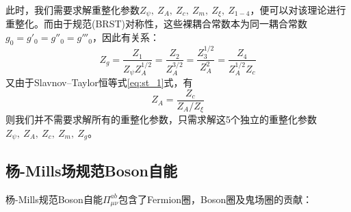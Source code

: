 此时，我们需要求解重整化参数$Z_\psi,~Z_A,~Z_c,~Z_m,~Z_\xi,~Z_{1-4}$，便可以对该理论进行重整化。而由于规范(BRST)对称性，这些裸耦合常数本为同一耦合常数$g_0=g'_0=g''_0=g'''_0$，因此有关系：
\begin{equation}
    Z_g= \frac{Z_1}{Z_\psi Z_A^{1/2}} = \frac{Z_2}{Z_A^{3/2}}=\frac{Z_3^{1/2}}{Z_A^{2}}=\frac{Z_4}{Z^{1/2}_AZ_c}
\end{equation}
又由于Slavnov–Taylor恒等式\eqref{eq:st_1}式，有
\begin{equation}
    Z_A = \frac{Z_c}{Z_A/Z_\xi}
\end{equation}
则我们并不需要求解所有的重整化参数，只需求解这5个独立的重整化参数$Z_\psi,~Z_A,~Z_c,~Z_m,~Z_{g}$。
\subsection{杨-Mills场规范Boson自能}
杨-Mills规范Boson自能$\Pi^{ab}_{\mu\nu} $包含了Fermion圈，Boson圈及鬼场圈的贡献：
